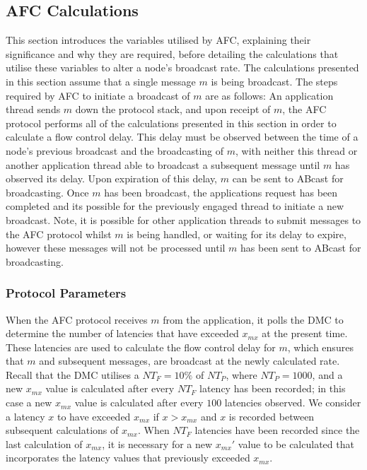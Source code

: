     \subsection*{AFC Calculations}     
     This section introduces the variables utilised by AFC, explaining their significance and why they are required, before detailing the calculations that utilise these variables to alter a node's broadcast rate.  The calculations presented in this section assume that a single message $m$ is being broadcast.  The steps required by AFC to initiate a broadcast of $m$ are as follows: An application thread sends $m$ down the protocol stack, and upon receipt of $m$, the AFC protocol performs all of the calculations presented in this section in order to calculate a flow control delay.  This delay must be observed between the time of a node's previous broadcast and the broadcasting of $m$, with neither this thread or another application thread able to broadcast a subsequent message until $m$ has observed its delay.  Upon expiration of this delay, $m$ can be sent to \textsf{ABcast} for broadcasting.  Once $m$ has been broadcast, the applications request has been completed and its possible for the previously engaged thread to initiate a new broadcast.  Note, it is possible for other application threads to submit messages to the AFC protocol whilst $m$ is being handled, or waiting for its delay to expire, however these messages will not be processed until $m$ has been sent to \textsf{ABcast} for broadcasting.  
   
   \subsubsection*{Protocol Parameters}  
   When the AFC protocol receives $m$ from the application, it polls the DMC to determine the number of latencies that have exceeded $x_{mx}$ at the present time.  These latencies are used to calculate the flow control delay for $m$, which ensures that $m$ and subsequent messages, are broadcast at the newly calculated rate.  Recall that the DMC utilises a $NT_F = 10\%$ of $NT_P$, where $NT_P = 1000$, and a new $x_{mx}$ value is calculated after every $NT_F$ latency has been recorded; in this case a new $x_{mx}$ value is calculated after every $100$ latencies observed.    We consider a latency $x$ to have exceeded $x_{mx}$ if $x > x_{mx}$ and $x$ is recorded between subsequent calculations of $x_{mx}$.  When $NT_F$ latencies have been recorded since the last calculation of $x_{mx}$, it is necessary for a new $x_{mx}'$ value to be calculated that incorporates the latency values that previously exceeded $x_{mx}$.  
   
